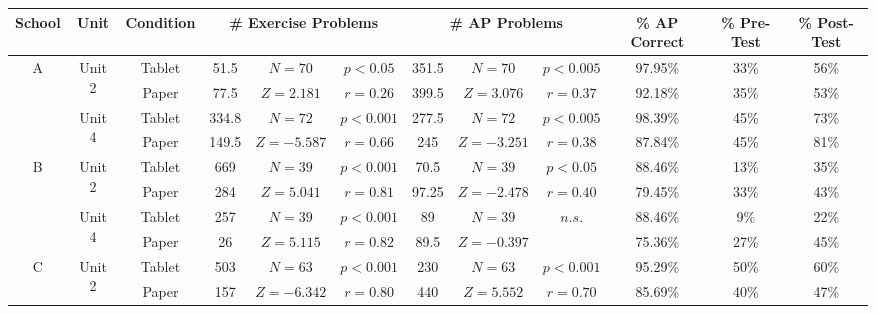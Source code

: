 
\small
\begin{tabular}{|c|c|c|ccc|ccc|c|c|c|}
\hline
School & Unit & Condition& \multicolumn{3}{|c|}{\# Exercise Problems} & \multicolumn{3}{|c|}{\# AP Problems} & \% AP Correct & \% Pre-Test & \% Post-Test\\
\hline
\hline
\multirow{4}{*}{A}  & 
\multirow{2}{*}{Unit 2}  & 
Tablet & 51.5 & \scriptsize{$N=70$} & \scriptsize{$p<0.05$} & 351.5 & \scriptsize{$N=70$} & \scriptsize{$p<0.005$} & 97.95\% & 33\% & 56\%  \\
 & 
 & 
Paper & 77.5& \scriptsize{$Z=2.181$} & \scriptsize{$r=0.26$} & 399.5 & \scriptsize{$Z=3.076$} & \scriptsize{$r=0.37$} & 92.18\% & 35\% & 53\%    \\
\cline{2-12}
 & 
\multirow{2}{*}{Unit 4}  & 
Tablet & 334.8 & \scriptsize{$N=72$} & \scriptsize{$p<0.001$} & 277.5 & \scriptsize{$N=72$} & \scriptsize{$p<0.005$} & 98.39\% & 45\% & 73\% \\
 & 
 & 
Paper & 149.5 & \scriptsize{$Z=-5.587$} & \scriptsize{$r=0.66$} & 245 & \scriptsize{$Z=-3.251$} & \scriptsize{$r=0.38$} & 87.84\% & 45\% & 81\% \\
\hline
\hline
\multirow{4}{*}{B}  & 
\multirow{2}{*}{Unit 2}  & 
Tablet & 669 & \scriptsize{$N=39$} & \scriptsize{$p<0.001$} & 70.5 & \scriptsize{$N=39$} & \scriptsize{$p<0.05$} & 88.46\% & 13\% & 35\%   \\
 & 
 & 
Paper & 284 & \scriptsize{$Z=5.041$} & \scriptsize{$r=0.81$} & 97.25 & \scriptsize{$Z=-2.478$} & \scriptsize{$r=0.40$} & 79.45\% & 33\% & 43\%    \\
\cline{2-12}
 & 
\multirow{2}{*}{Unit 4}  & 
Tablet & 257 & \scriptsize{$N=39$} & \scriptsize{$p<0.001$} & 89 & \scriptsize{$N=39$} & \scriptsize{$n.s.$} & 88.46\% & 9\% & 22\% \\
 & 
 & 
Paper & 26 & \scriptsize{$Z=5.115$} & \scriptsize{$r=0.82$} & 89.5 & \scriptsize{$Z=-0.397$} &  & 75.36\% & 27\% & 45\% \\
\hline
\hline
\multirow{4}{*}{C}  & 
\multirow{2}{*}{Unit 2}  & 
Tablet & 503 & \scriptsize{$N=63$} & \scriptsize{$p<0.001$} & 230 & \scriptsize{$N=63$} & \scriptsize{$p<0.001$} & 95.29\% & 50\% & 60\%  \\
 & 
 & 
Paper & 157 & \scriptsize{$Z=-6.342$} & \scriptsize{$r=0.80$} & 440 & \scriptsize{$Z=5.552$} & \scriptsize{$r=0.70$} & 85.69\% & 40\% & 47\%   \\

\end{tabular}
